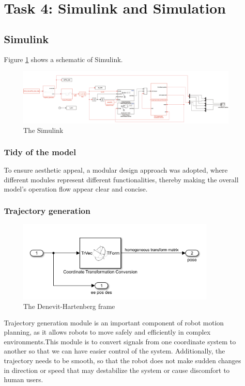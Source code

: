\section{Task 4: Simulink and Simulation}
\FloatBarrier %

\subsection{Simulink}
Figure \ref{F 5.1} shows a schematic of Simulink.
\begin{figure}[htp]
    \centering
    \includegraphics[width=17cm]{./fig/sim.jpg}
    \caption{The Simulink}
    \label{F 5.1}
\end{figure}

\subsubsection*{Tidy of the model}
To ensure aesthetic appeal, a modular design approach was adopted, where different modules represent different functionalities, thereby making the overall model's operation flow appear clear and concise.

\subsubsection*{Trajectory generation}

\begin{figure}[htbp]
    \centering
    \includegraphics[width=10cm]{./fig/traj.png}
    \caption{The Denevit-Hartenberg frame}
    \label{F 5.2}
\end{figure}

Trajectory generation module is an important component of robot motion planning, as it allows robots to move safely and efficiently in complex environments.This module is to convert signals from one coordinate system to another so that we can have easier control of the system. Additionally, the trajectory needs to be smooth, so that the robot does not make sudden changes in direction or speed that may destabilize the system or cause discomfort to human users.


